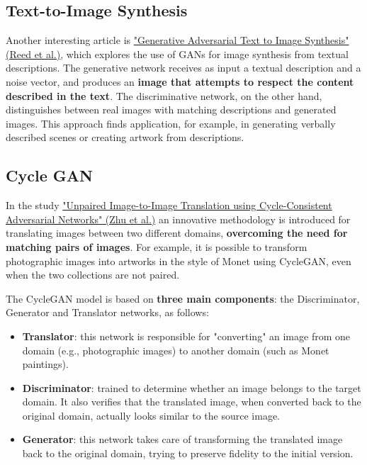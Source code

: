 \subsection{Text-to-Image Synthesis}

Another interesting article is \href{https://arxiv.org/pdf/1605.05396}{"Generative Adversarial Text to Image Synthesis" (Reed et al.)}, which explores the use of GANs for image synthesis from textual descriptions. The generative network receives as input a textual description and a noise vector, and produces an \textbf{image that attempts to respect the content described in the text}. The discriminative network, on the other hand, distinguishes between real images with matching descriptions and generated images. This approach finds application, for example, in generating verbally described scenes or creating artwork from descriptions.

\subsection{Cycle GAN}



In the study \href{https://arxiv.org/pdf/1703.10593}{"Unpaired Image-to-Image Translation using Cycle-Consistent Adversarial Networks" (Zhu et al.)} an innovative methodology is introduced for translating images between two different domains, \textbf{overcoming the need for matching pairs of images}. For example, it is possible to transform photographic images into artworks in the style of Monet using CycleGAN, even when the two collections are not paired.

The CycleGAN model is based on \textbf{three main components}: the Discriminator, Generator and Translator networks, as follows:

\begin{itemize}
\item \textbf{Translator}: this network is responsible for "converting" an image from one domain (e.g., photographic images) to another domain (such as Monet paintings).

\item \textbf{Discriminator}: trained to determine whether an image belongs to the target domain. It also verifies that the translated image, when converted back to the original domain, actually looks similar to the source image.

\item \textbf{Generator}: this network takes care of transforming the translated image back to the original domain, trying to preserve fidelity to the initial version.
\end{itemize}


